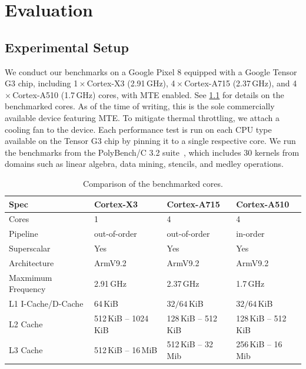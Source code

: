 \chapter{Evaluation}
\label{ch:eval}


\section{Experimental Setup}\label{sec:experimental-setup}

We conduct our benchmarks on a Google Pixel 8 equipped with a Google Tensor G3 chip, including 1\,$\times$\,Cortex-X3 (2.91\,GHz), 4\,$\times$\,Cortex-A715 (2.37\,GHz), and 4\,$\times$\,Cortex-A510 (1.7\,GHz) cores, with \ac{MTE} enabled.
See \cref{tab:cores-comparison} for details on the benchmarked cores.
As of the time of writing, this is the sole commercially available device featuring \ac{MTE}.
To mitigate thermal throttling, we attach a cooling fan to the device.
Each performance test is run on each CPU type available on the Tensor G3 chip by pinning it to a single respective core.
We run the benchmarks from the PolyBench/C 3.2 suite~\cite{polybenchc}, which includes 30 kernels from domains such as linear algebra, data mining, stencils, and medley operations.


\begin{table}[ht]
    \centering
    \small
    \caption{Comparison of the benchmarked cores.}
    \label{tab:cores-comparison}
    \begin{tabular}{l || l | l | l}
        \textbf{Spec}      & \textbf{Cortex-X3}    & \textbf{Cortex-A715} & \textbf{Cortex-A510} \\
        \hline
        Cores              & 1                     & 4                    & 4                    \\
        Pipeline           & out-of-order          & out-of-order         & in-order             \\
        Superscalar        & Yes                   & Yes                  & Yes                  \\
        Architecture       & ArmV9.2               & ArmV9.2              & ArmV9.2              \\
        Maxmimum Frequency & 2.91\,GHz             & 2.37\,GHz            & 1.7\,GHz             \\
        L1 I-Cache/D-Cache & 64\,KiB               & $32/64$\,KiB         & $32/64$\,KiB         \\
        L2 Cache           & 512\,KiB -- 1024\,KiB & 128\,KiB -- 512\,KiB & 128\,KiB -- 512\,KiB \\
        L3 Cache           & 512\,KiB -- 16\,MiB   & 512\,KiB -- 32\,Mib  & 256\,KiB -- 16\,Mib  \\
    \end{tabular}
\end{table}


